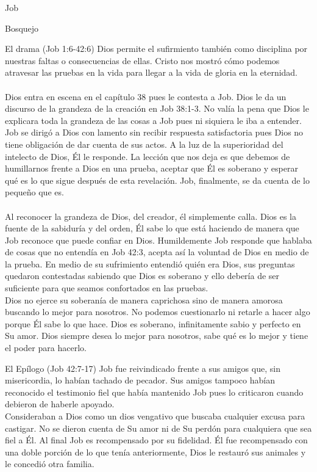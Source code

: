 \begin{section}{Job}
\begin{subsection}{Bosquejo}
\begin{subsubsection}{El drama (Job 1:6-42:6)}
Dios permite el sufirmiento también como disciplina por nuestras faltas o consecuencias de ellas. Cristo nos mostró cómo podemos atravesar las pruebas en la vida para llegar a la vida de gloria en la eternidad.\\
\\
Dios entra en escena en el capítulo 38 pues le contesta a Job. Dios le da un discurso de la grandeza de la creación en Job 38:1-3. No valía la pena que Dios le explicara toda la grandeza de las cosas a Job pues ni siquiera le iba a entender. \\
Job se dirigó a Dios con lamento sin recibir respuesta satisfactoria pues Dios no tiene obligación de dar cuenta de sus actos. A la luz de la superioridad del intelecto de Dios, Él le responde. La lección que nos deja es que debemos de humillarnos frente a Dios en una prueba, aceptar que Él es soberano y esperar qué es lo que sigue después de esta revelación. Job, finalmente, se da cuenta de lo pequeño que es.\\
\\
Al reconocer la grandeza de Dios, del creador, él simplemente calla. Dios es la fuente de la sabiduría y del orden, Él sabe lo que está haciendo de manera que Job reconoce que puede confiar en Dios. Humildemente Job responde que hablaba de cosas que no entendía en Job 42:3,  acepta así la voluntad de Dios en medio de la prueba. En medio de su sufrimiento entendió quién era Dios, sus preguntas quedaron contestadas sabiendo que Dios es soberano y ello debería de ser suficiente para que seamos confortados en las pruebas.\\
Dios no ejerce su soberanía de manera caprichosa sino de manera amorosa buscando lo mejor para nosotros. No podemos cuestionarlo ni retarle a hacer algo porque Él sabe lo que hace. Dios es soberano, infinitamente sabio y perfecto en Su amor. Dios siempre desea lo mejor para nosotros, sabe qué es lo mejor y tiene el poder para hacerlo.
\end{subsubsection}
\begin{subsubsection}{El Epílogo (Job 42:7-17)}
Job fue reivindicado frente a sus amigos que, sin misericordia, lo habían tachado de pecador. Sus amigos tampoco habían reconocido el testimonio fiel que había mantenido Job pues lo criticaron cuando debieron de haberle apoyado.\\
	Consideraban a Dios como un dios vengativo que buscaba cualquier excusa para castigar. No se dieron cuenta de Su amor ni de Su perdón para cualquiera que sea fiel a Él. Al final Job es recompensado por su fidelidad. Él fue recompensado con una doble porción de lo que tenía anteriormente, Dios le restauró sus animales y le concedió otra familia.\\

\end{subsubsection}
\end{subsection}
\end{section}

